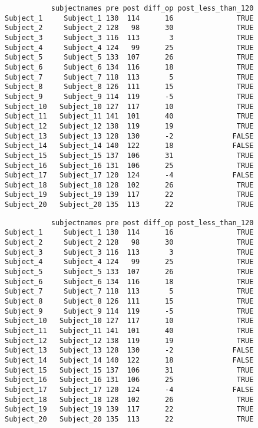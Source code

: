 \documentclass[
  letterpaper,
  DIV=11,
  numbers=noendperiod]{scrartcl}
\newenvironment{Shaded}{\begin{snugshade}}{\end{snugshade}}
\newcommand{\CommentTok}[1]{\textcolor[rgb]{0.37,0.37,0.37}{#1}}
\newcommand{\NormalTok}[1]{\textcolor[rgb]{0.00,0.23,0.31}{#1}}
\newcommand{\SpecialCharTok}[1]{\textcolor[rgb]{0.37,0.37,0.37}{#1}}
\begin{document}
\begin{verbatim}
           subjectnames pre post diff_op post_less_than_120
Subject_1     Subject_1 130  114      16               TRUE
Subject_2     Subject_2 128   98      30               TRUE
Subject_3     Subject_3 116  113       3               TRUE
Subject_4     Subject_4 124   99      25               TRUE
Subject_5     Subject_5 133  107      26               TRUE
Subject_6     Subject_6 134  116      18               TRUE
Subject_7     Subject_7 118  113       5               TRUE
Subject_8     Subject_8 126  111      15               TRUE
Subject_9     Subject_9 114  119      -5               TRUE
Subject_10   Subject_10 127  117      10               TRUE
Subject_11   Subject_11 141  101      40               TRUE
Subject_12   Subject_12 138  119      19               TRUE
Subject_13   Subject_13 128  130      -2              FALSE
Subject_14   Subject_14 140  122      18              FALSE
Subject_15   Subject_15 137  106      31               TRUE
Subject_16   Subject_16 131  106      25               TRUE
Subject_17   Subject_17 120  124      -4              FALSE
Subject_18   Subject_18 128  102      26               TRUE
Subject_19   Subject_19 139  117      22               TRUE
Subject_20   Subject_20 135  113      22               TRUE
\end{verbatim}

\begin{Shaded}
\end{Shaded}

\begin{verbatim}
           subjectnames pre post diff_op post_less_than_120
Subject_1     Subject_1 130  114      16               TRUE
Subject_2     Subject_2 128   98      30               TRUE
Subject_3     Subject_3 116  113       3               TRUE
Subject_4     Subject_4 124   99      25               TRUE
Subject_5     Subject_5 133  107      26               TRUE
Subject_6     Subject_6 134  116      18               TRUE
Subject_7     Subject_7 118  113       5               TRUE
Subject_8     Subject_8 126  111      15               TRUE
Subject_9     Subject_9 114  119      -5               TRUE
Subject_10   Subject_10 127  117      10               TRUE
Subject_11   Subject_11 141  101      40               TRUE
Subject_12   Subject_12 138  119      19               TRUE
Subject_13   Subject_13 128  130      -2              FALSE
Subject_14   Subject_14 140  122      18              FALSE
Subject_15   Subject_15 137  106      31               TRUE
Subject_16   Subject_16 131  106      25               TRUE
Subject_17   Subject_17 120  124      -4              FALSE
Subject_18   Subject_18 128  102      26               TRUE
Subject_19   Subject_19 139  117      22               TRUE
Subject_20   Subject_20 135  113      22               TRUE
\end{verbatim}
\end{document}

